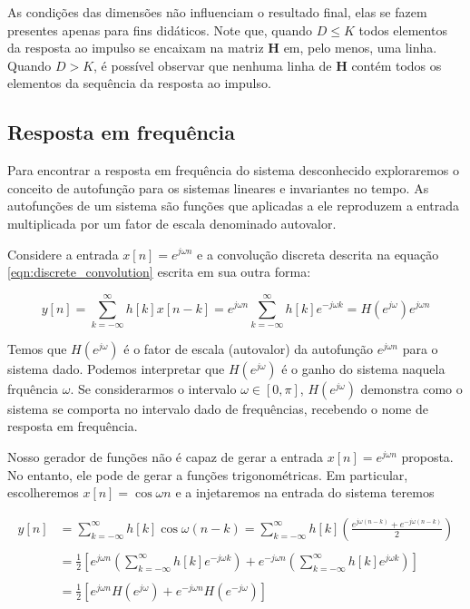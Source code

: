 \documentclass[x11names,a4paper,12pt]{article}
\begin{document}
As condições das dimensões não influenciam o resultado final, elas se fazem presentes apenas para fins didáticos. Note que, quando $D\leq K$ todos elementos da resposta ao impulso se encaixam na matriz $\mathbf{H}$ em, pelo menos, uma linha. Quando $D>K$, é possível observar que nenhuma linha de $\mathbf{H}$ contém todos os elementos da sequência da resposta ao impulso.

\subsection{Resposta em frequência}

Para encontrar a resposta em frequência do sistema desconhecido exploraremos o conceito de autofunção para os sistemas lineares e invariantes no tempo. As autofunções de um sistema são funções que aplicadas a ele reproduzem a entrada multiplicada por um fator de escala denominado autovalor.

Considere a entrada $x[n]=e^{j\omega n}$ e a convolução discreta descrita na equação \ref{eqn:discrete_convolution} escrita em sua outra forma:

\begin{equation}
  y[n]=\sum_{k=-\infty}^{\infty}{h[k]x[n-k]}=e^{j\omega n}\sum_{k=-\infty}^{\infty}{h[k]e^{-j\omega k}}=H(e^{j\omega})e^{j\omega n}
\end{equation}

Temos que $H(e^{j\omega})$ é o fator de escala (autovalor) da autofunção $e^{j\omega n}$ para o sistema dado. Podemos interpretar que $H(e^{j\omega})$ é o ganho do sistema naquela frquência $\omega$. Se considerarmos o intervalo $ \omega \in [0,\pi]$, $H(e^{j\omega})$ demonstra como o sistema se comporta no intervalo dado de frequências, recebendo o nome de resposta em frequência.

Nosso gerador de funções não é capaz de gerar a entrada $x[n]=e^{j\omega n}$ proposta. No entanto, ele pode de gerar a funções trigonométricas. Em particular, escolheremos $x[n]=\cos{\omega n}$ e a injetaremos na entrada do sistema teremos

\begin{equation}
  \begin{aligned}
    y[n] & = \sum_{k=-\infty}^{\infty}h[k]\cos{\omega (n-k)} = \sum_{k=-\infty}^{\infty}h[k] \left( \frac{e^{j\omega (n-k)}+e^{-j\omega (n-k)}}{2} \right) \\
    \\
         & = \frac{1}{2} \left[ e^{j\omega n} \left(\sum_{k=-\infty}^{\infty}h[k]e^{-j\omega k} \right) + e^{-j\omega n} \left(\sum_{k=-\infty}^{\infty}h[k]e^{j\omega k} \right)  \right] \\
    \\
         & = \frac{1}{2} \left[ e^{j\omega n} H(e^{j\omega}) + e^{-j\omega n} H(e^{-j\omega}) \right]
  \end{aligned}
\end{equation}
\end{document}
